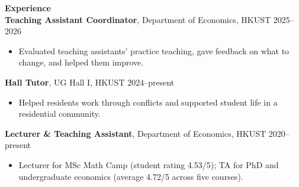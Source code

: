 ﻿\documentclass[11pt,letterpaper]{article}
\begin{document}
{\large \textbf{Experience}}\\[-0.5pt]
\textbf{Teaching Assistant Coordinator}, Department of Economics, HKUST \hfill 2025--2026\\
\vspace{-6pt}
\begin{itemize}
  \item Evaluated teaching assistants' practice teaching, gave feedback on what to change, and helped them improve.
\end{itemize}
\textbf{Hall Tutor}, UG Hall I, HKUST \hfill 2024--present\\
\vspace{-6pt}
\begin{itemize}
  \item Helped residents work through conflicts and supported student life in a residential community.
\end{itemize}
\textbf{Lecturer \& Teaching Assistant}, Department of Economics, HKUST \hfill 2020--present\\
\vspace{-6pt}
\begin{itemize}
  \item Lecturer for MSc Math Camp (student rating 4.53/5); TA for PhD and undergraduate economics (average 4.72/5 across five courses).
\end{itemize}

\vspace{16pt}
\end{document}
